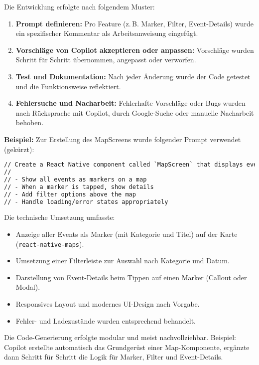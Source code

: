 Die Entwicklung erfolgte nach folgendem Muster:
\begin{enumerate}
      \item \textbf{Prompt definieren:} Pro Feature (z.\,B. Marker, Filter, Event-Details) wurde ein spezifischer Kommentar als Arbeitsanweisung eingefügt.
      \item \textbf{Vorschläge von Copilot akzeptieren oder anpassen:} Vorschläge wurden Schritt für Schritt übernommen, angepasst oder verworfen.
      \item \textbf{Test und Dokumentation:} Nach jeder Änderung wurde der Code getestet und die Funktionsweise reflektiert.
      \item \textbf{Fehlersuche und Nacharbeit:} Fehlerhafte Vorschläge oder Bugs wurden nach Rücksprache mit Copilot, durch Google-Suche oder manuelle Nacharbeit behoben.
\end{enumerate}

\textbf{Beispiel:}
Zur Erstellung des MapScreens wurde folgender Prompt verwendet (gekürzt):

\begin{lstlisting}[language=HTML]
// Create a React Native component called `MapScreen` that displays event markers on a map using event data from the `EventsProvider` context. Requirements:
//
// - Show all events as markers on a map
// - When a marker is tapped, show details
// - Add filter options above the map
// - Handle loading/error states appropriately
\end{lstlisting}

Die technische Umsetzung umfasste:
\begin{itemize}
      \item Anzeige aller Events als Marker (mit Kategorie und Titel) auf der Karte
            (\texttt{react-native-maps}).
      \item Umsetzung einer Filterleiste zur Auswahl nach Kategorie und Datum.
      \item Darstellung von Event-Details beim Tippen auf einen Marker (Callout oder
            Modal).
      \item Responsives Layout und modernes UI-Design nach Vorgabe.
      \item Fehler- und Ladezustände wurden entsprechend behandelt.
\end{itemize}

Die Code-Generierung erfolgte modular und meist nachvollziehbar. Beispiel:
Copilot erstellte automatisch das Grundgerüst einer Map-Komponente, ergänzte
dann Schritt für Schritt die Logik für Marker, Filter und Event-Details.

